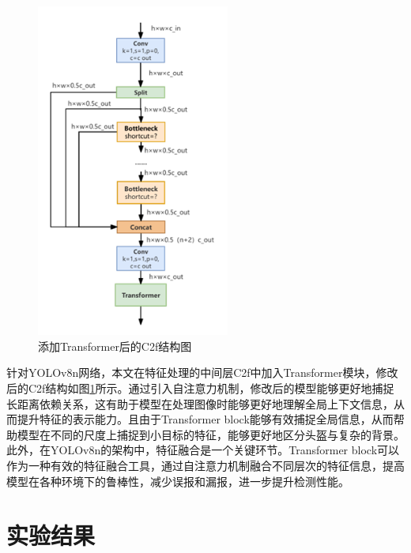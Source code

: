 \documentclass[journal]{IEEEtran}
\numberwithin{figure}{section}%
\numberwithin{table}{section}%
\numberwithin{equation}{section}
\begin{document}
\begin{figure}
  \centering
  \includegraphics[width=2.5in]{./figures/4_4.png}
  \caption{添加Transformer后的C2f结构图}
  \label{fig:C2fr}
\end{figure}

针对YOLOv8n网络，本文在特征处理的中间层C2f中加入Transformer模块，修改后的C2f结构如图\ref{fig:C2fr}所示。通过引入自注意力机制，修改后的模型能够更好地捕捉长距离依赖关系，这有助于模型在处理图像时能够更好地理解全局上下文信息，从而提升特征的表示能力。且由于Transformer block能够有效捕捉全局信息，从而帮助模型在不同的尺度上捕捉到小目标的特征，能够更好地区分头盔与复杂的背景。此外，在YOLOv8n的架构中，特征融合是一个关键环节。Transformer block可以作为一种有效的特征融合工具，通过自注意力机制融合不同层次的特征信息，提高模型在各种环境下的鲁棒性，减少误报和漏报，进一步提升检测性能。
\setcounter{equation}{0}

\section{实验结果}
\end{document}
